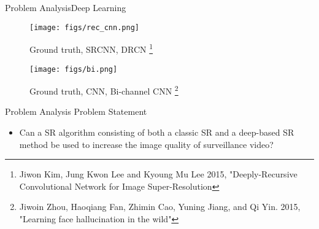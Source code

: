 \begin{frame}{Problem Analysis}{Deep Learning}
    \begin{block}{}
        \setlength{\belowcaptionskip}{-2ex}
\begin{figure}
    \vspace*{-1cm}
    \texttt{[image: figs/rec\_cnn.png]}
    \caption*{Ground truth, SRCNN, DRCN \footnote{Jiwon Kim, Jung Kwon Lee and Kyoung Mu Lee 2015, "Deeply-Recursive Convolutional Network for Image Super-Resolution}}
\end{figure}
\begin{figure}
    \texttt{[image: figs/bi.png]}
    \caption*{Ground truth, CNN, Bi-channel CNN \footnote{Jiwoin Zhou, Haoqiang Fan, Zhimin Cao, Yuning Jiang, and Qi Yin. 2015, "Learning face hallucination in the wild"}}
\end{figure}
\setlength{\belowcaptionskip}{2ex} 
    \end{block}
\end{frame}

\begin{frame}{Problem Analysis}
    Problem Statement
    \begin{itemize}
        \item Can a SR algorithm consisting of both a classic SR and a deep-based SR method be used to increase the image quality of surveillance video?
    \end{itemize}
\end{frame}


